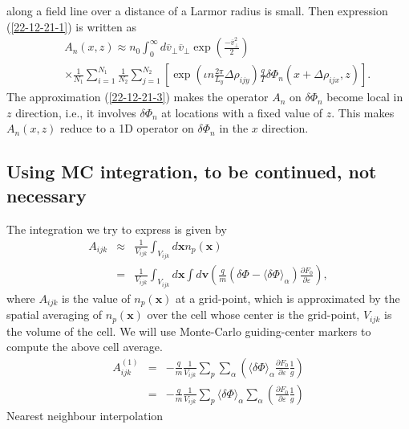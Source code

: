 \documentclass{article}
\begin{document}
along a field line over a distance of a Larmor radius is small. Then
expression (\ref{22-12-21-1}) is written as
\begin{eqnarray}
  &  & A_n (x, z) \approx n_0  \int_0^{\infty} d \overline{v}_{\perp}
  \overline{v}_{\perp} \exp \left( \frac{- \overline{v}^2_{\perp}}{2} \right)
  \nonumber\\
  &  & \times \frac{1}{N_1} \sum_{i = 1}^{N_1} \frac{1}{N_2}  \sum_{j =
  1}^{N_2} \left[ \exp \left( \iota n \frac{2 \pi}{L_y} \Delta \rho_{i j y}
  \right) \frac{q}{T} \delta \Phi_n (x + \Delta \rho_{i j x}, z) \right] . 
\end{eqnarray}
The approximation (\ref{22-12-21-3}) makes the operator $A_n$ on $\delta
\Phi_n$ become local in $z$ direction, i.e., it involves $\delta \Phi_n$ at
locations with a fixed value of $z$. This makes $A_n (x, z)$ reduce to a 1D
operator on $\delta \Phi_n$ in the $x$ direction.

\subsection{Using MC integration, to be continued, not necessary}

The integration we try to express is given by
\begin{eqnarray}
  A_{i j k} & \approx & \frac{1}{V_{i j k}} \int_{V_{i j k}} d\mathbf{x}n_p
  (\mathbf{x}) \nonumber\\
  & = & \frac{1}{V_{i j k}} \int_{V_{i j k}} d\mathbf{x} \int d\mathbf{v}
  \left( \frac{q}{m} (\delta \Phi - \langle \delta \Phi \rangle_{\alpha})
  \frac{\partial F_0}{\partial \varepsilon} \right), 
\end{eqnarray}
where $A_{i j k}$ is the value of $n_p (\mathbf{x})$ at a grid-point, which is
approximated by the spatial averaging of $n_p (\mathbf{x})$ over the cell
whose center is the grid-point, $V_{i j k}$ is the volume of the cell. We will
use Monte-Carlo guiding-center markers to compute the above cell average.
\begin{eqnarray*}
  A_{i j k}^{(1)} & = & - \frac{q}{m} \frac{1}{V_{i j k}} \sum_p \sum_{\alpha}
  \left( \langle \delta \Phi \rangle_{\alpha} \frac{\partial F_0}{\partial
  \varepsilon} \frac{1}{g} \right)\\
  & = & - \frac{q}{m} \frac{1}{V_{i j k} } \sum_p \langle \delta \Phi
  \rangle_{\alpha} \sum_{\alpha} \left( \frac{\partial F_0}{\partial
  \varepsilon} \frac{1}{g} \right)
\end{eqnarray*}
Nearest neighbour interpolation
\end{document}
